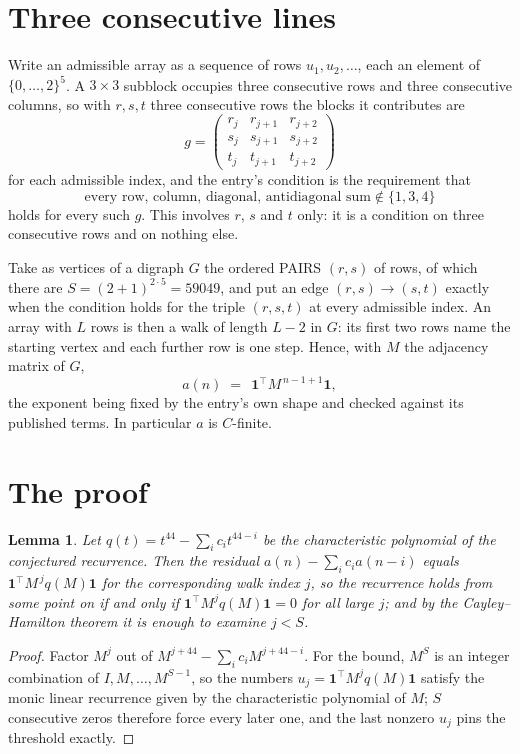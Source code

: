 \documentclass[11pt,a4paper]{article}
\theoremstyle{plain}
\newtheorem{lemma}[theorem]{Lemma}
\theoremstyle{definition}
\begin{document}
\section{Three consecutive lines}

Write an admissible array as a sequence of rows $u_1,u_2,\dots$, each an element of
$\{0,\dots,2\}^{5}$. A $3\times3$ subblock occupies three consecutive rows and
three consecutive columns, so with $r,s,t$ three consecutive rows the blocks it
contributes are
\[
g=\begin{pmatrix}r_j&r_{j+1}&r_{j+2}\\ s_j&s_{j+1}&s_{j+2}\\ t_j&t_{j+1}&t_{j+2}\end{pmatrix}
\]
for each admissible index, and the entry's condition is the requirement that
\[
\text{every row, column, diagonal, antidiagonal sum} \notin \{1,3,4\}
\]
holds for every such $g$. This involves $r$, $s$ and $t$ only: it is a condition on
three consecutive rows and on nothing else.

Take as vertices of a digraph $G$ the ordered PAIRS $(r,s)$ of rows, of which there are
$S=(2+1)^{2\cdot5}=59049$, and put an edge $(r,s)\to(s,t)$ exactly when the condition
holds for the triple $(r,s,t)$ at every admissible index. An array with $L$ rows is then a
walk of length $L-2$ in $G$: its first two rows name the starting vertex and each further
row is one step. Hence, with $M$ the adjacency matrix of $G$,
\[
a(n)\;=\;\,\mathbf{1}^{\!\top}M^{\,n-1+1}\mathbf{1},
\]
the exponent being fixed by the entry's own shape and checked against its published terms.
In particular $a$ is $C$-finite.

\section{The proof}

\begin{lemma}\label{lem:crit}
Let $q(t)=t^{44}-\sum_i c_it^{44-i}$ be the characteristic polynomial of the
conjectured recurrence. Then the residual $a(n)-\sum_ic_ia(n-i)$ equals
$\mathbf{1}^{\!\top}M^{\,j}q(M)\mathbf{1}$ for the corresponding walk index
$j$, so the recurrence holds from some point on if and only if
$\mathbf{1}^{\!\top}M^{j}q(M)\mathbf{1}=0$ for all large $j$; and by the
Cayley--Hamilton theorem it is enough to examine $j<S$.
\end{lemma}

\begin{proof}
Factor $M^{j}$ out of $M^{j+44}-\sum_ic_iM^{j+44-i}$. For the bound, $M^{S}$
is an integer combination of $I,M,\dots,M^{S-1}$, so the numbers
$u_j=\mathbf{1}^{\!\top}M^{j}q(M)\mathbf{1}$ satisfy the monic linear recurrence given by
the characteristic polynomial of $M$; $S$ consecutive zeros therefore force every later one,
and the last nonzero $u_j$ pins the threshold exactly.
\end{proof}
\end{document}
